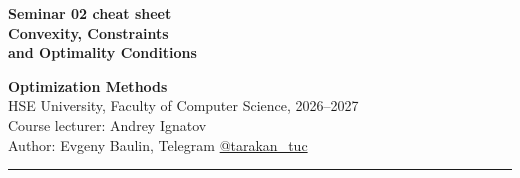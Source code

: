 \documentclass[10pt,a4paper]{article}
\begin{document}
\thispagestyle{fancy}

\noindent
\begin{minipage}[b]{0.6\textwidth}
  \RaggedRight{}
  {\color{hseaccent}\bfseries\small Seminar 02 cheat sheet}\\[1pt]
  {\color{hseblue}\bfseries\Large Convexity, Constraints\\ and Optimality Conditions}
\end{minipage}\hfill
\begin{minipage}[b]{0.39\textwidth}
  \raggedleft\footnotesize
  {\bfseries Optimization Methods}\\
  HSE University, Faculty of Computer Science, 2026--2027\\
  Course lecturer: Andrey Ignatov\\
  Author: Evgeny Baulin, Telegram \href{https://t.me/tarakan_tuc}{@tarakan\_tuc}
\end{minipage}

\vspace{2pt}
{\color{hseblue}\rule{\textwidth}{0.8pt}}
\vspace{-4pt}
\end{document}
